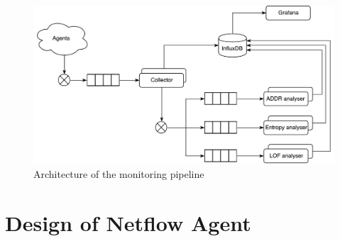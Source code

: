 \begin{figure}[h]
	\centering
	\includegraphics[width=\textwidth]{figures/300-concept-architecture.pdf}
	\caption[Pipeline Architecture]{Architecture of the monitoring pipeline}
	\label{fig:concept:architecture}
\end{figure}

\section{Design of Netflow Agent}
\label{sec:concept:agent}

